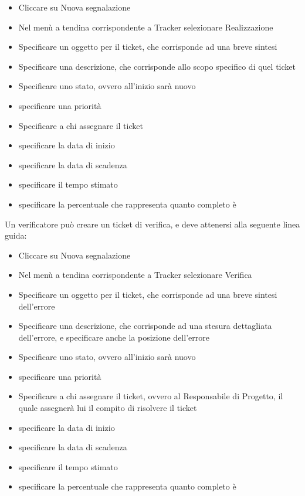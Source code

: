 \begin{itemize}
\item Cliccare su Nuova segnalazione
\item Nel menù a tendina corrispondente a Tracker selezionare Realizzazione
\item Specificare un oggetto per il ticket, che corrisponde ad una breve sintesi
\item Specificare una descrizione, che corrisponde allo scopo specifico di quel ticket
\item Specificare uno stato, ovvero all'inizio sarà nuovo
\item specificare una priorità
\item Specificare a chi assegnare il ticket
\item specificare la data di inizio
\item specificare la data di scadenza
\item specificare il tempo stimato
\item specificare la percentuale che rappresenta quanto completo è
\end{itemize}

Un verificatore può creare un ticket di verifica, e deve attenersi alla seguente linea guida:
\begin{itemize}
\item Cliccare su Nuova segnalazione
\item Nel menù a tendina corrispondente a Tracker selezionare Verifica
\item Specificare un oggetto per il ticket, che corrisponde ad una breve sintesi dell'errore
\item Specificare una descrizione, che corrisponde ad una stesura dettagliata dell'errore, e specificare anche la posizione dell'errore
\item Specificare uno stato, ovvero all'inizio sarà nuovo
\item specificare una priorità
\item Specificare a chi assegnare il ticket, ovvero al Responsabile di Progetto, il quale assegnerà lui il compito di risolvere il ticket
\item specificare la data di inizio
\item specificare la data di scadenza
\item specificare il tempo stimato
\item specificare la percentuale che rappresenta quanto completo è
\end{itemize}


